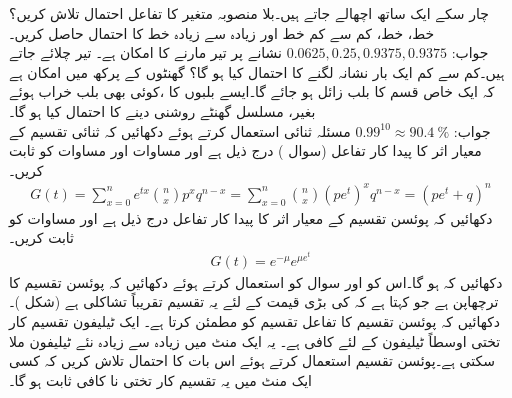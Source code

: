 \quad
چار سکے ایک ساتھ  اچھالے جاتے ہیں۔بلا منصوبہ متغیر  کا تفاعل احتمال تلاش کریں؟  خط،  خط، کم سے کم  خط اور زیادہ سے زیادہ   خط کا احتمال حاصل کریں۔\\
جواب:\quad
$0.0625, 0.25, 0.9375,0.9375$
\quad
نشانے پر تیر مارنے کا امکان  ہے۔  تیر چلائے جاتے ہیں۔کم سے کم ایک بار نشانہ لگنے کا احتمال کیا ہو گا؟
\quad
{} گھنٹوں کے پرکھ میں  امکان ہے کہ ایک خاص قسم کا بلب زائل ہو جائے گا۔ایسے  بلبوں کا ،کوئی بھی بلب خراب ہوئے بغیر، مسلسل  گھنٹے  روشنی دینے کا احتمال کیا ہو گا۔\\
جواب:\quad
$0.99^{10}\approx \SI{90.4}{\percent}$
\quad
مسئلہ ثنائی استعمال کرتے ہوئے دکھائیں کہ ثنائی تقسیم کے  معیار اثر کا پیدا کار تفاعل (سوال ) درج ذیل ہے اور مساوات  اور مساوات  کو ثابت کریں۔
\begin{align*}
G(t)=\sum_{x=0}^{n}e^{tx}\binom{n}{x}p^xq^{n-x}=\sum_{x=0}^{n}\binom{n}{x}(pe^t)^xq^{n-x}=(pe^t+q)^n
\end{align*}  
\quad
دکھائیں کہ پوئسن تقسیم کے  معیار اثر کا پیدا کار تفاعل  درج ذیل ہے اور مساوات  کو ثابت کریں۔
\begin{align*}
G(t)=e^{-\mu}e^{\mu e^t}
\end{align*}  
\quad
دکھائیں کہ  ہو گا۔اس کو اور سوال  کو استعمال کرتے ہوئے  دکھائیں کہ پوئسن تقسیم کا ترچھاپن  ہے جو کہتا ہے کہ  کی بڑی قیمت کے لئے یہ تقسیم تقریباً تشاکلی ہے (شکل )۔
\quad
دکھائیں کہ پوئسن تقسیم کا تفاعل تقسیم  کو مطمئن کرتا ہے۔
\quad
ایک ٹیلیفون تقسیم کار تختی اوسطاً  ٹیلیفون کے لئے کافی ہے۔ یہ ایک منٹ میں زیادہ سے زیادہ  نئے ٹیلیفون ملا سکتی ہے۔پوئسن تقسیم استعمال کرتے ہوئے اس بات کا احتمال تلاش کریں کہ کسی ایک منٹ میں یہ تقسیم کار تختی نا کافی ثابت ہو گا۔
